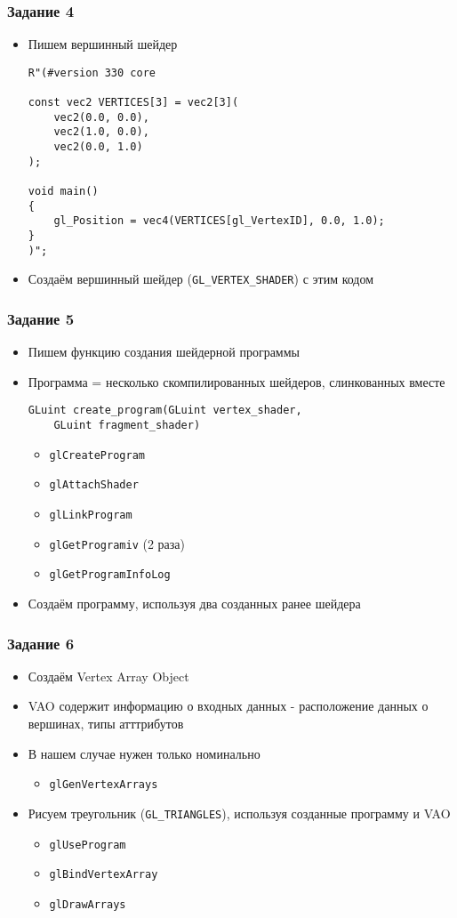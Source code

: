 \documentclass{beamer}
\begin{document}
\begin{frame}[fragile]
\frametitle{Задание 4}
\begin{itemize}
\item Пишем вершинный шейдер
\pause
\begin{verbatim}
R"(#version 330 core

const vec2 VERTICES[3] = vec2[3](
    vec2(0.0, 0.0),
    vec2(1.0, 0.0),
    vec2(0.0, 1.0)
);

void main()
{
    gl_Position = vec4(VERTICES[gl_VertexID], 0.0, 1.0);
}
)";
\end{verbatim}
\pause
\item Создаём вершинный шейдер (\verb|GL_VERTEX_SHADER|) с этим кодом
\end{itemize}
\end{frame}

\begin{frame}[fragile]
\frametitle{Задание 5}
\begin{itemize}
\item Пишем функцию создания шейдерной программы
\item Программа = несколько скомпилированных шейдеров, слинкованных вместе
\begin{verbatim}
GLuint create_program(GLuint vertex_shader,
    GLuint fragment_shader)
\end{verbatim}
\pause
\begin{itemize}
\item \verb|glCreateProgram|
\item \verb|glAttachShader|
\item \verb|glLinkProgram|
\item \verb|glGetProgramiv| (2 раза)
\item \verb|glGetProgramInfoLog|
\end{itemize}
\pause
\item Создаём программу, используя два созданных ранее шейдера
\end{itemize}
\end{frame}

\begin{frame}[fragile]
\frametitle{Задание 6}
\begin{itemize}
\item Создаём Vertex Array Object
\item VAO содержит информацию о входных данных - расположение данных о вершинах, типы атттрибутов
\item В нашем случае нужен только номинально
\pause
\begin{itemize}
\item \verb|glGenVertexArrays|
\end{itemize}
\pause
\item Рисуем треугольник (\verb|GL_TRIANGLES|), используя созданные программу и VAO
\pause
\begin{itemize}
\item \verb|glUseProgram|
\item \verb|glBindVertexArray|
\item \verb|glDrawArrays|
\end{itemize}
\end{itemize}
\end{frame}
\end{document}
